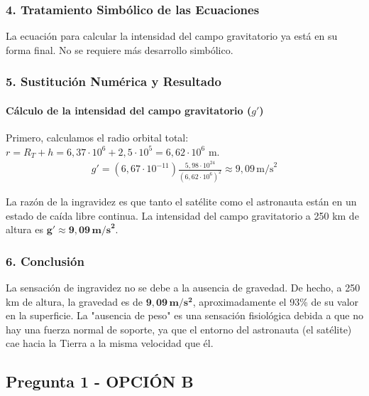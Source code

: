\subsubsection*{4. Tratamiento Simbólico de las Ecuaciones}
La ecuación para calcular la intensidad del campo gravitatorio ya está en su forma final. No se requiere más desarrollo simbólico.

\subsubsection*{5. Sustitución Numérica y Resultado}
\paragraph*{Cálculo de la intensidad del campo gravitatorio ($g'$)}
Primero, calculamos el radio orbital total: $r = R_T + h = 6,37 \cdot 10^6 + 2,5 \cdot 10^5 = 6,62 \cdot 10^6 \text{ m}$.
\begin{gather}
    g' = (6,67 \cdot 10^{-11}) \frac{5,98 \cdot 10^{24}}{(6,62 \cdot 10^6)^2} \approx 9,09 \, \text{m/s}^2
\end{gather}
\begin{cajaresultado}
La razón de la ingravidez es que tanto el satélite como el astronauta están en un estado de caída libre continua. La intensidad del campo gravitatorio a 250 km de altura es $\boldsymbol{g' \approx 9,09 \, \textbf{m/s}^2}$.
\end{cajaresultado}

\subsubsection*{6. Conclusión}
\begin{cajaconclusion}
La sensación de ingravidez no se debe a la ausencia de gravedad. De hecho, a 250 km de altura, la gravedad es de $\mathbf{9,09 \, m/s^2}$, aproximadamente el 93\% de su valor en la superficie. La "ausencia de peso" es una sensación fisiológica debida a que no hay una fuerza normal de soporte, ya que el entorno del astronauta (el satélite) cae hacia la Tierra a la misma velocidad que él.
\end{cajaconclusion}

\newpage

\subsection{Pregunta 1 - OPCIÓN B}
\label{subsec:1B_2002_sep_ext}

